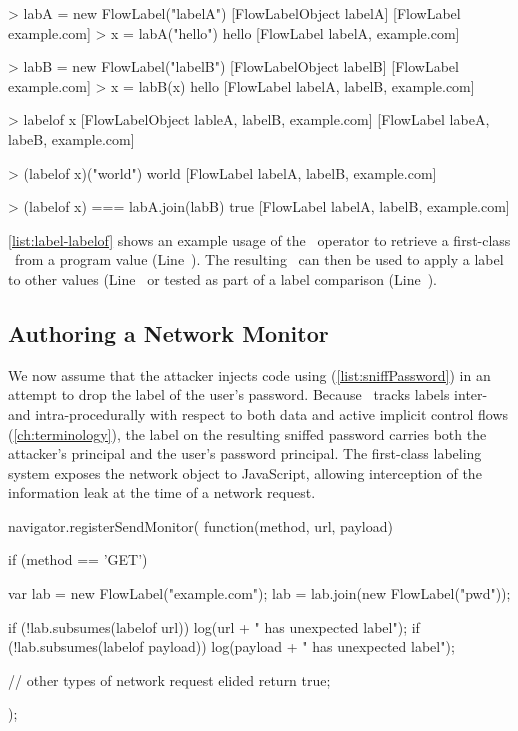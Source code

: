 \begin{jscode}
> labA = new FlowLabel("labelA")
  [FlowLabelObject labelA] [FlowLabel example.com]
> x = labA("hello")
  hello [FlowLabel labelA, example.com]

> labB = new FlowLabel("labelB")
  [FlowLabelObject labelB] [FlowLabel example.com]
> x = labB(x)
  hello [FlowLabel labelA, labelB, example.com]

> labelof x
  [FlowLabelObject lableA, labelB, example.com]
    [FlowLabel labeA, labeB, example.com]

> (labelof x)("world")
  world [FlowLabel labelA, labelB, example.com]

> (labelof x) === labA.join(labB)
  true [FlowLabel labelA, labelB, example.com]
\end{jscode}

\autoref{list:label-labelof} shows an example usage of the \mlabelof\ operator to retrieve a first-class \FlowLabelObject\ from a program value (Line~).
The resulting \FlowLabelObject\ can then be used to apply a label to other values (Line~ or tested as part of a label comparison (Line~).

\subsection{Authoring a Network Monitor}
\label{subsec:network-monitor}

We now assume that the attacker injects code using  (\autoref{list:sniffPassword}) in an attempt to drop the label of the user's password.
Because \FlowCore\ tracks labels inter- and intra-procedurally with respect to both data and active implicit control flows (\autoref{ch:terminology}), the label on the resulting sniffed password carries both the attacker's principal and the user's password principal.
The first-class labeling system exposes the network object to JavaScript, allowing interception of the information leak at the time of a network request.

\begin{jscode}
navigator.registerSendMonitor(
  function(method, url, payload) {
    if (method == 'GET') {
      var lab = new FlowLabel("example.com");
      lab = lab.join(new FlowLabel("pwd"));

      if (!lab.subsumes(labelof url))
        log(url + " has unexpected label");
      if (!lab.subsumes(labelof payload))
        log(payload + " has unexpected label");
    }
    // other types of network request elided
    return true;
  });
\end{jscode}

